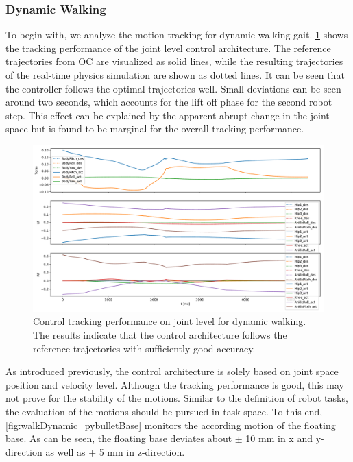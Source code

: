 \subsubsection{Dynamic Walking}
To begin with, we analyze the motion tracking for dynamic walking gait. \cref{fig:walkDynamic_pybulletTracking} shows the tracking performance of the joint level control architecture. The reference trajectories from \gls{OC} are visualized as solid lines, while the resulting trajectories of the real-time physics simulation are shown as dotted lines. It can be seen that the controller follows the optimal trajectories well. Small deviations can be seen around two seconds, which accounts for the lift off phase for the second robot step. This effect can be explained by the apparent abrupt change in the joint space but is found to be marginal for the overall tracking performance. 
\begin{figure}[h!]
\centering	
\includegraphics[width=1\textwidth]{fig/walkDynamic/pybullet/pybulletTracking}
\caption[Control tracking performance on joint level for dynamic walking]{Control tracking performance on joint level for dynamic walking. The results indicate that the control architecture follows the reference trajectories with sufficiently good accuracy.}
\label{fig:walkDynamic_pybulletTracking}
\end{figure}
As introduced previously, the control architecture is solely based on joint space position and velocity level. Although the tracking performance is good, this may not prove for the stability of the motions. Similar to the definition of robot tasks, the evaluation of the motions should be pursued in task space. To this end, \cref{fig:walkDynamic_pybulletBase} monitors the according motion of the floating base. As can be seen, the floating base deviates about $\pm$ 10 mm in x and y-direction as well as $+$ 5 mm in z-direction. 
